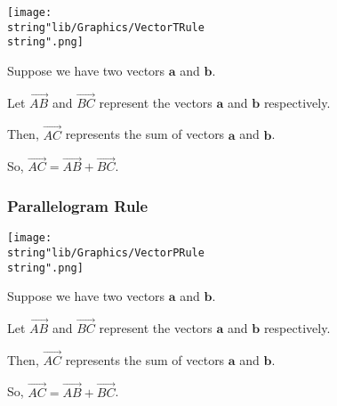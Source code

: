 \documentclass[11pt,a4paper]{book}
\begin{document}
\begin{minipage}[t]{0.4\textwidth}
\begin{center}
\texttt{[image: \\string"lib/Graphics/VectorTRule\\string".png]}
\par\end{center}

\end{minipage}
\begin{minipage}[t]{0.6\textwidth}

\begin{tcolorbox}[colback=blue!5, colframe=black, boxrule=.4pt, sharpish corners]

Suppose we have two vectors $\textbf{a}$ and $\textbf{b}$.

\medskip{}

Let $\overrightarrow{AB}$ and $\overrightarrow{BC}$ represent the
vectors $\textbf{a}$ and $\textbf{b}$ respectively.

\medskip{}

Then, $\overrightarrow{AC}$ represents the sum of vectors $\textbf{a}$
and $\textbf{b}$.

\medskip{}

So, $\overrightarrow{AC}=\overrightarrow{AB}+\overrightarrow{BC}$.
\end{tcolorbox}

\end{minipage}

\subsubsection{Parallelogram Rule}

\begin{minipage}[t]{0.45\textwidth}
\begin{center}
\texttt{[image: \\string"lib/Graphics/VectorPRule\\string".png]}
\par\end{center}

\end{minipage}
\begin{minipage}[t]{0.6\textwidth}

\begin{tcolorbox}[colback=blue!5, colframe=black, boxrule=.4pt, sharpish corners]

Suppose we have two vectors $\textbf{a}$ and $\textbf{b}$.

\medskip{}

Let $\overrightarrow{AB}$ and $\overrightarrow{BC}$ represent the
vectors $\textbf{a}$ and $\textbf{b}$ respectively.

\medskip{}

Then, $\overrightarrow{AC}$ represents the sum of vectors $\textbf{a}$
and $\textbf{b}$.

\medskip{}

So, $\overrightarrow{AC}=\overrightarrow{AB}+\overrightarrow{BC}$.
\end{tcolorbox}

\end{minipage}
\end{document}
